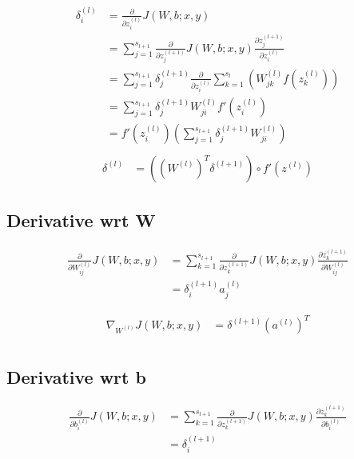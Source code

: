 \documentclass{article}
\begin{document}
	\begin{equation}
		\begin{aligned}
			\delta_i^{(l)} &= \frac{\partial}{\partial z_i^{(l)}} J(W, b; x, y) \\	
			&= \sum_{j=1}^{s_{l+1}} \frac{\partial}{\partial z_j^{(l+1)}} J(W, b; x, y) \frac{\partial z_j^{(l+1)}}{\partial z_i^{(l)}} \\
			&= \sum_{j=1}^{s_{l+1}} \delta_j^{(l+1)} 
			\frac{\partial}{\partial z_i^{(l)}} \sum_{k=1}^{s_{l}}(W_{jk}^{(l)}f(z_k^{(l)})) \\
			&= \sum_{j=1}^{s_{l+1}} \delta_j^{(l+1)} W_{ji}^{(l)} f'(z_i^{(l)}) \\
			&= f'(z_i^{(l)})(\sum_{j=1}^{s_{l+1}} \delta_j^{(l+1)} W_{ji}^{(l)}) \\
		\end{aligned}
	\end{equation}
	\begin{equation}
		\begin{aligned}
			\delta^{(l)} &= ((W^{(l)})^T \delta^{(l+1)}) \circ f'(z^{(l)}) 
		\end{aligned}
	\end{equation}
	\subsection{Derivative wrt W}
	\begin{equation}
		\begin{aligned}
			\frac{\partial}{\partial W_{ij}^{(l)}} J(W, b; x, y) &= \sum_{k=1}^{s_{l+1}} \frac{\partial}{\partial z_k^{(l+1)}}J(W, b; x, y) \frac{\partial z_k^{(l+1)}}{\partial  W_{ij}^{(l)}} \\
			&= \delta_i^{(l+1)} a_j^{(l)}
		\end{aligned}
	\end{equation}
	
	\begin{equation}
		\begin{aligned}
			\nabla_{W^{(l)}} J(W, b; x, y) &= \delta^{(l+1)}(a^{(l)})^T \\
		\end{aligned}
	\end{equation}
	\subsection{Derivative wrt b}
	\begin{equation}
		\begin{aligned}
			\frac{\partial}{\partial b_{i}^{(l)}} J(W, b; x, y) &=  \sum_{k=1}^{s_{l+1}} \frac{\partial}{\partial z_k^{(l+1)}}J(W, b; x, y) \frac{\partial z_k^{(l+1)}}{\partial  b_{i}^{(l)}} \\
			&= \delta_i^{(l+1)} 
		\end{aligned}
	\end{equation}
		
\end{document}
